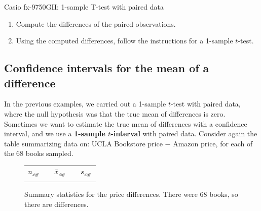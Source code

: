 \begin{onebox}{Casio fx-9750GII: 1-sample T-test with paired data}
\begin{enumerate}
\setlength{\itemsep}{0mm}
\item Compute the differences of the paired observations.
\item Using the computed differences, follow the instructions for a 1-sample $t$-test.
\end{enumerate}
\end{onebox}


\D{~}


\subsection{Confidence intervals for the mean of a difference}
\label{ciMeanOfDifferences}

In the previous examples, we carried out a 1-sample $t$-test with paired data, where the null hypothesis was that the true mean of differences is zero. Sometimes we want to estimate the true mean of differences with a confidence interval, and we use a \textbf{1-sample $t$-interval} with paired data. Consider again the table summarizing data on: UCLA Bookstore price $-$ Amazon price, for each of the 68 books sampled.

\begin{figure}[hh]
\centering
\begin{tabular}{ccccc}
\hline
$n_{_{\text{\emph{diff}}}}$	&\hspace{3mm}& $\bar{x}_{_{\text{\emph{diff}}}}$	&\hspace{3mm}& $s_{_{\text{\emph{diff}}}}$ \vspace{1mm}\\
\uclabookN{}  && \uclabookM{}  && \uclabookSD{} \\
\hline
\end{tabular}
\caption{Summary statistics for the price differences.
    There were 68 books, so there are \uclabookN{}
    differences.}
\label{textbooksSummaryStats1}
\end{figure}

